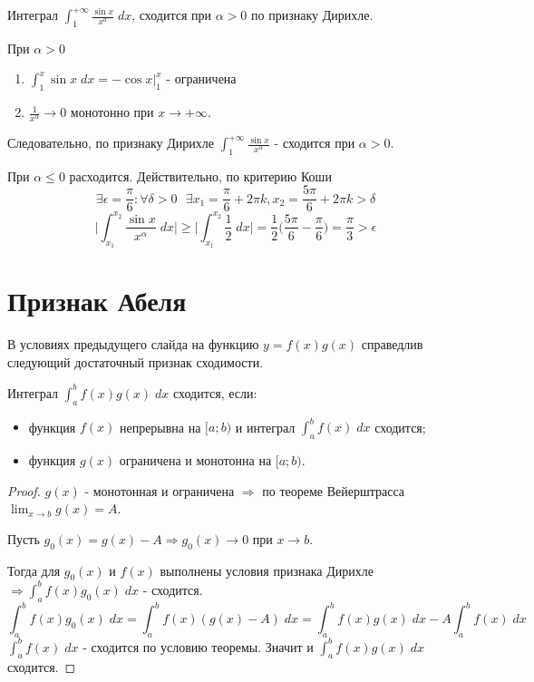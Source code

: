     \begin{example}
    	Интеграл $\displaystyle \int_1^{+\infty} {\frac{\sin{x}}{x^a}} \; dx$, сходится при $\alpha > 0$ по признаку Дирихле.
    \end{example}
    
    При $\alpha > 0$
    \begin{enumerate}
    	\item $\int_1^x \sin{x} \; dx = -\cos{x} \bigg|_1^x$ - ограничена
    	\item $\frac{1}{x^{\alpha}} \to 0$ монотонно при $x \to +\infty$.
    \end{enumerate}
    Следовательно, по признаку Дирихле $\int_1^{+\infty} \frac{\sin{x}}{x^{\alpha}}$ - сходится при $\alpha > 0$.
    
    При $\alpha \leqslant 0$ расходится. Действительно, по критерию Коши
    \[ \exists \epsilon = \frac{\pi}{6}: \forall \delta > 0 \text{ } \exists x_1 = \frac{\pi}{6} + 2\pi k, x_2 = \frac{5\pi}{6} + 2\pi k > \delta\]
    \[ \bigg|\int_{x_1}^{x_2} \frac{\sin{x}}{x^{\alpha}} \; dx\bigg| \geqslant \bigg|\int_{x_1}^{x_2} \frac{1}{2} \; dx\bigg| = \frac{1}{2} \bigg(\frac{5\pi}{6} - \frac{\pi}{6}\bigg) = \frac{\pi}{3} > \epsilon \]
    
    \section{Признак Абеля}
    
    В условиях предыдущего слайда на функцию $y = f(x)g(x)$ справедлив следующий достаточный признак сходимости.
    
    \begin{theorem}
    	Интеграл $\int_a^b f(x)g(x) \; dx$ сходится, если:
    	\begin{itemize}
    		\item функция $f(x)$ непрерывна на $[a; b)$ и интеграл $\int_a^b f(x) \; dx$ сходится;
    		\item функция $g(x)$ ограничена и монотонна на $[a; b)$.
    	\end{itemize}
    \end{theorem}
    
    \begin{proof}
    	$g(x)$ - монотонная и ограничена $\Rightarrow$ по теореме Вейерштрасса $\lim_{x \to b} g(x) = A$.
    	
    	Пусть $g_0(x) = g(x) - A \Rightarrow g_0(x) \to 0$ при $x \to b$.
    	
    	Тогда для $g_0(x)$ и $f(x)$ выполнены условия признака Дирихле $\Rightarrow \int_a^b f(x) g_0(x) \; dx$ - сходится.
    	\[ \int_a^b f(x) g_0(x) \; dx = \int_a^b f(x) (g(x) - A) \; dx = \int_a^b f(x) g(x) \; dx - A \int_a^b f(x) \; dx \]
    	$\int_a^b f(x) \; dx$ - сходится по условию теоремы. Значит и $\int_a^b f(x) g(x) \; dx$ сходится.
    \end{proof}
    
